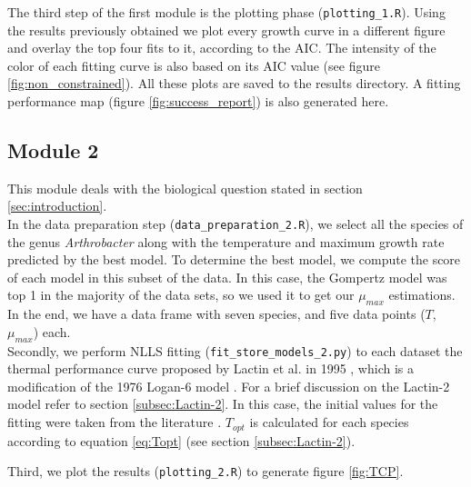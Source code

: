 \documentclass[titlepage,11pt]{article}
\begin{document}
\begin{linenumbers}
	The third step of the first module is the plotting phase (\verb|plotting_1.R|). Using the results previously obtained we plot every growth curve in a different figure and overlay the top four fits to it, according to the AIC. The intensity of the color of each fitting curve is also based on its AIC value (see figure \ref{fig:non_constrained}). All these plots are saved to the results directory. A fitting performance map (figure \ref{fig:success_report}) is also generated here.
	\subsection{Module 2}
	This module deals with the biological question stated in section \ref{sec:introduction}. \\
	In the data preparation step (\verb|data_preparation_2.R|), we select all the species of the genus \textit{Arthrobacter} along with the temperature and maximum growth rate predicted by the best model. To determine the best model, we compute the score of each model in this subset of the data. In this case, the Gompertz model was top 1 in the majority of the data sets, so we used it to get our $ \mu_{max} $ estimations. In the end, we have a data frame with seven species, and five data points ($ T $, $ \mu_{max} $) each. \\
	Secondly, we perform NLLS fitting (\verb|fit_store_models_2.py|) to each dataset the thermal performance curve proposed by Lactin et al. in 1995 \cite{Lactin1995}, which is a modification of the 1976 Logan-6 model \cite{Logan1976}. For a brief discussion on the Lactin-2 model refer to section \ref{subsec:Lactin-2}. In this case, the initial values for the fitting were taken from the literature \cite{Lactin1995}. $ T_{opt} $ is calculated for each species according to equation \ref{eq:Topt} (see section \ref{subsec:Lactin-2}). 

	Third, we plot the results (\verb|plotting_2.R|) to generate figure \ref{fig:TCP}.

\end{linenumbers}
\end{document}
